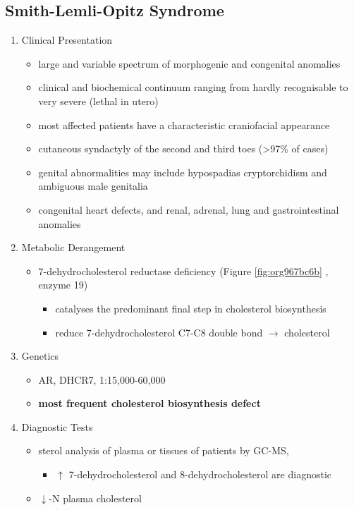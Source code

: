 \documentclass{scrartcl}
\begin{document}
\subsection{Smith-Lemli-Opitz Syndrome}
\label{sec:orgf19044e}
\begin{enumerate}
\item Clinical Presentation
\label{sec:org998486a}
\begin{itemize}
\item large and variable spectrum of morphogenic and congenital anomalies
\item clinical and biochemical continuum ranging from hardly recognisable
to very severe (lethal in utero)
\item most affected patients have a characteristic craniofacial appearance
\item cutaneous syndactyly of the second and third toes (>97\% of cases)
\item genital abnormalities may include hypospadias cryptorchidism and
ambiguous male genitalia
\item congenital heart defects, and renal, adrenal, lung and
gastrointestinal anomalies
\end{itemize}

\item Metabolic Derangement
\label{sec:org2a5acf4}
\begin{itemize}
\item 7-dehydrocholesterol reductase deficiency (Figure \ref{fig:org967bc6b} , enzyme 19)
\begin{itemize}
\item catalyses the predominant final step in cholesterol biosynthesis
\item reduce 7-dehydrocholesterol C7-C8 double bond \(\to\) cholesterol
\end{itemize}
\end{itemize}

\item Genetics
\label{sec:orgbc8e9c9}
\begin{itemize}
\item AR, DHCR7, 1:15,000-60,000
\item \textbf{most frequent cholesterol biosynthesis defect}
\end{itemize}

\item Diagnostic Tests
\label{sec:org9c5c3ac}
\begin{itemize}
\item sterol analysis of plasma or tissues of patients by GC-MS,
\begin{itemize}
\item \(\uparrow\) 7-dehydrocholesterol and 8-dehydrocholesterol are diagnostic
\end{itemize}
\item \(\downarrow\)-N plasma cholesterol
\end{itemize}


\end{enumerate}
\end{document}

